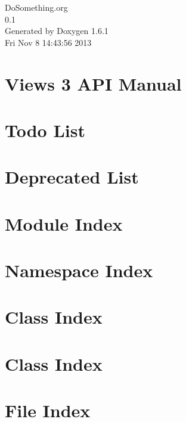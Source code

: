 \documentclass[a4paper]{book}
\begin{document}
\hypersetup{pageanchor=false}
\begin{titlepage}
\vspace*{7cm}
\begin{center}
{\Large DoSomething.org \\[1ex]\large 0.1 }\\
\vspace*{1cm}
{\large Generated by Doxygen 1.6.1}\\
\vspace*{0.5cm}
{\small Fri Nov 8 14:43:56 2013}\\
\end{center}
\end{titlepage}
\clearemptydoublepage
{}
\tableofcontents
\clearemptydoublepage
{}
\hypersetup{pageanchor=true}
\chapter{Views 3 API Manual}
\label{index}\hypertarget{index}{}
\chapter{Todo List}
\label{todo}
\hypertarget{todo}{}

\chapter{Deprecated List}
\label{deprecated}
\hypertarget{deprecated}{}

\chapter{Module Index}

\chapter{Namespace Index}

\chapter{Class Index}

\chapter{Class Index}

\chapter{File Index}

\end{document}
